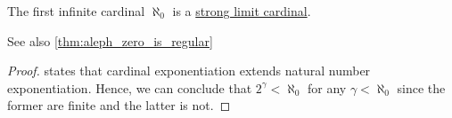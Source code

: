 \begin{corollary}\label{thm:aleph_zero_is_strong_limit}
  The first infinite cardinal \( \aleph_0 \) is a \hyperref[def:strong_limit_cardinal]{strong limit cardinal}.
\end{corollary}
\begin{comments}
  \item See also \cref{thm:aleph_zero_is_regular}
\end{comments}
\begin{proof}
   states that cardinal exponentiation extends natural number exponentiation. Hence, we can conclude that \( 2^\gamma < \aleph_0 \) for any \( \gamma < \aleph_0 \) since the former are finite and the latter is not.
\end{proof}

